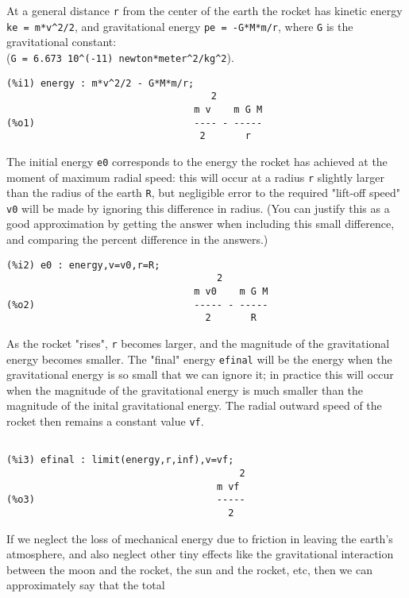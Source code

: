 \documentclass[12pt]{article}
\begin{document}
At a general distance \verb|r| from the center of the earth the rocket has kinetic
  energy \verb|ke = m*v^2/2|, and gravitational energy \verb|pe = -G*M*m/r|, where
  \verb|G| is the gravitational constant:\\
  (\verb|G = 6.673 10^(-11) newton*meter^2/kg^2|).
\small
\begin{verbatim}
(%i1) energy : m*v^2/2 - G*M*m/r;
                                    2
                                 m v    m G M
(%o1)                            ---- - -----
                                  2       r
\end{verbatim}
\normalsize
The initial energy \verb|e0| corresponds to the energy the rocket has achieved at the
  moment of maximum radial speed: this will occur at a radius \verb|r| slightly larger
  than the radius of the earth \verb|R|, but negligible error to the required "lift-off speed" \verb|v0| 
  will be made by ignoring this difference in radius. (You can justify this as a good approximation
  by getting the answer when including this small difference, and comparing the percent difference
  in the answers.)
\small
\begin{verbatim}					  
(%i2) e0 : energy,v=v0,r=R;
                                     2
                                 m v0    m G M
(%o2)                            ----- - -----
                                   2       R
\end{verbatim}
\normalsize
As the rocket "rises", \verb|r| becomes larger, and the magnitude of the gravitational
energy becomes smaller.
The "final" energy \verb|efinal| will be the energy when the gravitational energy is so small
  that we can ignore it; in practice this will occur when the magnitude of the gravitational
  energy is much smaller than the magnitude of the inital gravitational energy.
The radial outward speed of the rocket then remains a constant value \verb|vf|.
\small
\begin{verbatim}
								   
(%i3) efinal : limit(energy,r,inf),v=vf;
                                         2
                                     m vf
(%o3)                                -----
                                       2
\end{verbatim}
\normalsize
If we neglect the loss of mechanical energy due to friction in leaving the earth's atmosphere,
  and also neglect other tiny effects like the gravitational interaction between the moon and
  the rocket, the sun and the rocket, etc, then we can approximately say that the total
\end{document}
